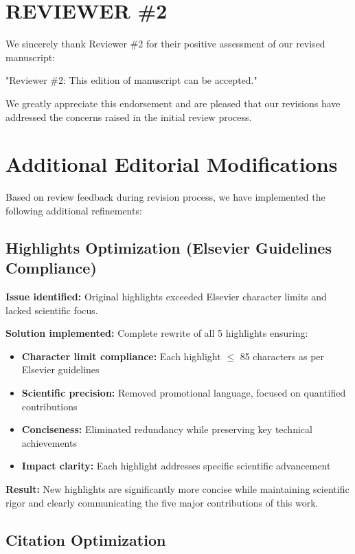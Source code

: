 \documentclass[11pt,a4paper]{article}
\begin{document}
\section*{REVIEWER \#2}

We sincerely thank Reviewer \#2 for their positive assessment of our revised manuscript:

"Reviewer \#2: This edition of manuscript can be accepted."

We greatly appreciate this endorsement and are pleased that our revisions have addressed the concerns raised in the initial review process.

\section*{Additional Editorial Modifications}

Based on review feedback during revision process, we have implemented the following additional refinements:

\subsection*{Highlights Optimization (Elsevier Guidelines Compliance)}

\textbf{Issue identified:} Original highlights exceeded Elsevier character limits and lacked scientific focus.

\textbf{Solution implemented:} Complete rewrite of all 5 highlights ensuring:
\begin{itemize}
    \item \textbf{Character limit compliance:} Each highlight $\leq$ 85 characters as per Elsevier guidelines
    \item \textbf{Scientific precision:} Removed promotional language, focused on quantified contributions
    \item \textbf{Conciseness:} Eliminated redundancy while preserving key technical achievements
    \item \textbf{Impact clarity:} Each highlight addresses specific scientific advancement
\end{itemize}

\textbf{Result:} New highlights are significantly more concise while maintaining scientific rigor and clearly communicating the five major contributions of this work.

\subsection*{Citation Optimization}
\end{document}
